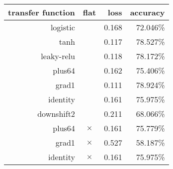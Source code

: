 \begin{tabular}{rcrr}
{\bf transfer function} & {\bf flat} & {\bf loss} & {\bf accuracy} \\
\hline 
logistic &   & 0.168 & 72.046\% \\
tanh &   & 0.117 & 78.527\% \\
leaky-relu &   & 0.118 & 78.172\% \\
plus64 &   & 0.162 & 75.406\% \\
grad1 &   & 0.111 & 78.924\% \\
identity &   & 0.161 & 75.975\% \\
downshift2 &   & 0.211 & 68.066\% \\
plus64 & $\times$ & 0.161 & 75.779\% \\
grad1 & $\times$ & 0.527 & 58.187\% \\
identity & $\times$ & 0.161 & 75.975\% \\
\end{tabular}
